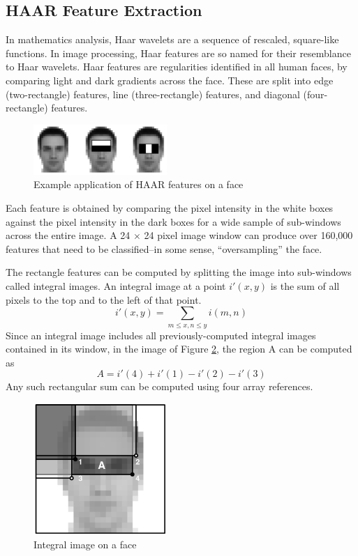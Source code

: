 \documentclass[journal]{IEEEtran}
\begin{document}
\subsection{HAAR Feature Extraction}
In mathematics analysis, Haar wavelets are a sequence of rescaled, square-like functions. In image processing, Haar features are so named for their resemblance to Haar wavelets. Haar features are regularities identified in all human faces, by comparing light and dark gradients across the face. These are split into edge (two-rectangle) features, line (three-rectangle) features, and diagonal (four-rectangle) features.
\begin{figure}[h]
	\centering
	\includegraphics[width=0.45\textwidth]{haar_features.png}
	\caption{Example application of HAAR features on a face}
    \label{haar-features-face-example}
\end{figure}
\par Each feature is obtained by comparing the pixel intensity in the white boxes against the pixel intensity in the dark boxes for a wide sample of sub-windows across the entire image. A 24 $\times$ 24 pixel image window can produce over 160,000 features that need to be classified--in some sense, “oversampling” the face.
\par The rectangle features can be computed by splitting the image into sub-windows called integral images. An integral image at a point $i'(x, y)$ is the sum of all pixels to the top and to the left of that point.
\[
i'(x, y) = \sum_{m \leq x, n \leq y}{i(m, n)}
\]
Since an integral image includes all previously-computed integral images contained in its window, in the image of Figure \ref{integral-image-face}, the region A can be computed as
\[
A = i'(4) + i'(1) - i'(2) - i'(3)
\]
Any such rectangular sum can be computed using four array references.
\begin{figure}[h]
	\centering
	\includegraphics[width=0.45\textwidth]{integral_image.png}
	\caption{Integral image on a face}
    \label{integral-image-face}
\end{figure}
\end{document}
